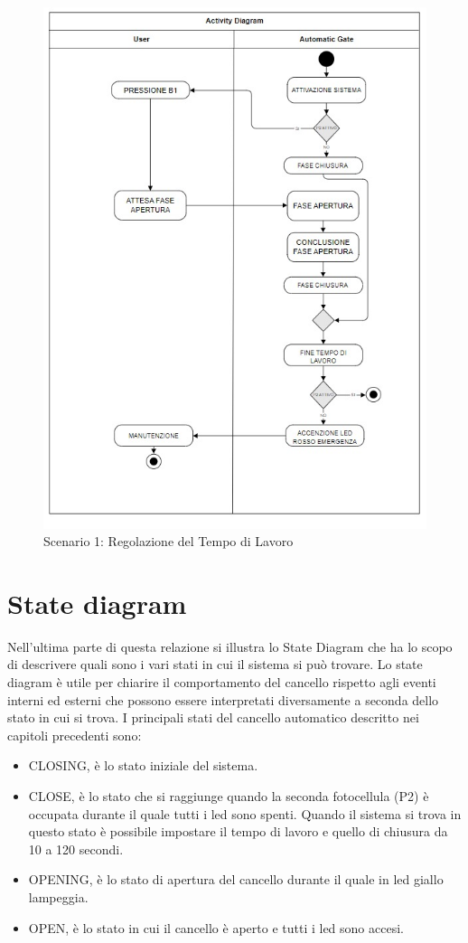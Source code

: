 \documentclass[12pt]{article}
\begin{document}
\begin{figure}[h]
    \centering
    \includegraphics[width = 0.7 \textwidth]{Scenario_4.jpg}
    \caption{Scenario 1: Regolazione del Tempo di Lavoro}
    
\end{figure}

\newpage

\section{State diagram}
Nell'ultima parte di questa relazione si illustra lo State Diagram che ha lo scopo di descrivere quali sono i vari stati in cui il sistema si può trovare. Lo state diagram è utile per chiarire il comportamento del cancello rispetto agli eventi interni ed esterni che possono essere interpretati diversamente a seconda dello stato in cui si trova.
I principali stati del cancello automatico descritto nei capitoli precedenti sono:
\begin{itemize}
    \item{CLOSING,} è lo stato iniziale del sistema.
    \item{CLOSE,} è lo stato che si raggiunge quando la seconda fotocellula (P2) è occupata durante il quale tutti i led sono spenti. Quando il sistema si trova in questo stato è possibile impostare il tempo di lavoro e quello di chiusura da 10 a 120 secondi.
    \item{OPENING,} è lo stato di apertura del cancello durante il quale in led giallo lampeggia.
    \item{OPEN,} è lo stato in cui il cancello è aperto e tutti i led sono accesi.
\end{itemize}
\end{document}
